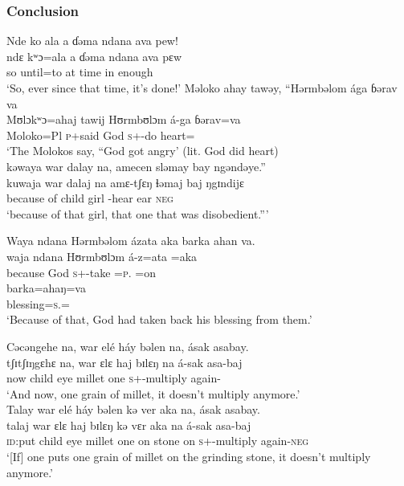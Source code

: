 \subsubsection*{Conclusion}
 \ea  Nde  ko  ala  a  ɗəma  ndana  ava  pew!\\
 \gll ndɛ    kʷɔ=ala  a    ɗəma   ndana    ava      pɛw\\
 so    until=to    at    time      {\DEM}    in    enough\\
 \glt ‘So, ever since that time, it’s done!’
 \z
 \ea  Məloko  ahay  tawəy,  “Hərmbəlom  ága  ɓərav  va  \\
 \gll Mʊlɔkʷɔ=ahaj  tawij  Hʊrmbʊlɔm     á-ga      ɓərav=va  \\
 Moloko=Pl       \textsc{p}+said  God        \textsc{s}+{\IFV}-do heart={\PRF}     \\
 \glt ‘The Molokos say, “God got angry’ (lit. God did heart)\\
 
 \medskip
  kəwaya  war  dalay  na,  amecen  sləmay  bay  ngəndəye.”\\
\gll kuwaja        war    dalaj     na amɛ-tʃɛŋ      ɬəmaj  baj     ŋgɪndijɛ\\
 {because of}  child    girl    {\PSP}  {\DEP}-hear   ear      \textsc{neg}  {\DEM}\\
 \glt ‘because of that girl, that one that was disobedient.”’
 \z
 
 \ea  Waya  ndana  Hərmbəlom  ázata  aka  barka  ahan  va.\\
 \gll waja   ndana  Hʊrmbʊlɔm   á-z=ata      =aka   \\    
 because   {\DEM}   God             \textsc{s}+{\IFV}-take  =\textsc{p}.{\IO}  =on   \\  
 
 \medskip
 \gll barka=ahaŋ=va\\
 blessing=\textsc{s}.{\POSS}={\PRF}\\
 \glt ‘Because of that, God had taken back his blessing from them.’\\
 \z
 
 \ea  Cəcəngehe  na,  war  elé  háy  bəlen  na,  ásak  asabay.\\
 \gll tʃɪtʃɪŋgɛhɛ  na,  war  ɛlɛ  haj  bɪlɛŋ  na  á-sak asa-baj\\
 now {\PSP}  child   eye   millet   one   {\PSP}  \textsc{s}+{\IFV}-multiply    again-{\NEG}\\
 \glt ‘And now, one grain of millet, it doesn’t multiply anymore.’\\
 \z
 \ea  Talay  war  elé  háy  bəlen  kə  ver  aka  na,  ásak  asabay.\\
 \gll talaj     war  ɛlɛ  haj  bɪlɛŋ  kə  vɛr  aka  na  á-sak       asa-baj\\
 \textsc{id}:put  child   eye   millet    one    on    stone    on    {\PSP}  \textsc{s}+{\IFV}-multiply  again-\textsc{neg}\\
 \glt ‘[If] one puts one grain of millet on the grinding stone, it doesn’t multiply anymore.’\\
 \z
 
